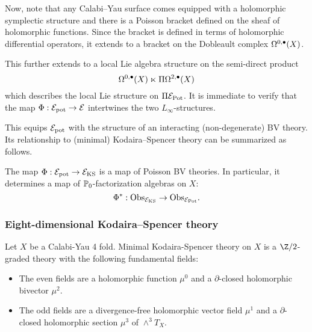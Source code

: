 \documentclass[11pt]{amsart}
\begin{document}
Now, note that any Calabi--Yau surface comes equipped with a holomorphic symplectic structure and there is a Poisson bracket defined on the sheaf of holomorphic functions.
Since the bracket is defined in terms of holomorphic differential operators, it extends to a bracket on the Dobleault complex $\Omega^{0,\bullet}(X)$.

This further extends to a local Lie algebra structure on the semi-direct product
\[
\Omega^{0,\bullet}(X) \ltimes \Pi \Omega^{2,\bullet}(X)
\]
which describes the local Lie structure on $\Pi \mathcal E_{\rm Pot}$.
It is immediate to verify that the map $\Phi : \mathcal E_{\rm pot} \to \mathcal E$ intertwines the two $L_\infty$-structures.

This equips $\mathcal E_{\rm pot}$ with the structure of an interacting (non-degenerate) BV theory.
Its relationship to (minimal) Kodaira--Spencer theory can be summarized as follows.

\begin{prop}
  The map $\Phi : \mathcal E_{\rm pot} \to \mathcal E_{\rm KS}$ is a map of Poisson BV theories.
  In particular, it determines a map of $\mathbb P_0$-factorization algebras on $X$:
\[
\Phi^* : {\rm Obs}_{\mathcal E_{\rm KS}} \to {\rm Obs}_{\mathcal E_{\rm Pot}} .
\]
\end{prop}

\subsubsection{Eight-dimensional Kodaira--Spencer theory}
\label{sec:orgeb2dd4d}

Let \(X\) be a Calabi-Yau 4 fold. Minimal Kodaira-Spencer theory on $X$ is a $\Z/2$-graded theory with the following fundamental fields:
\begin{itemize}
\item The even fields are a holomorphic function $\mu^0$ and a $\partial$-closed holomorphic bivector $\mu^2$.
\item The odd fields are a divergence-free holomorphic vector field $\mu^1$ and a $\partial$-closed holomorphic section $\mu^3$ of $\wedge^3 T_X$.
\end{itemize}
\end{document}
